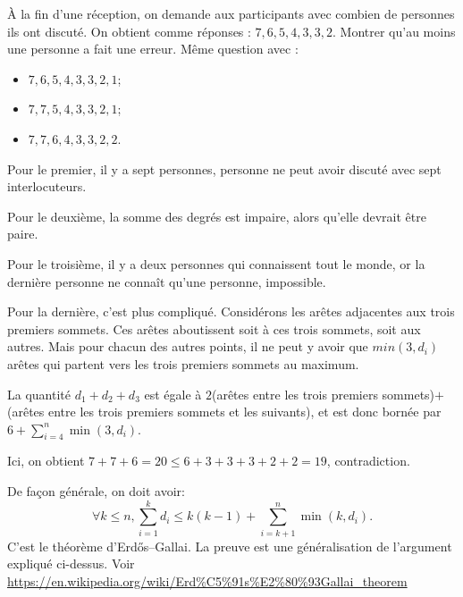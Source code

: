 \begin{exo}
À la fin d'une réception, on demande aux participants avec combien de personnes ils ont discuté. On obtient comme réponses : $7, 6, 5, 4, 3, 3, 2$. Montrer qu'au moins une personne a fait une erreur.
Même question avec :
\begin{itemize}
\item $7,6,5,4,3,3,2,1$; %
\item $7,7,5,4,3,3,2,1$;%
\item $7,7,6,4,3,3,2,2$. %
\end{itemize}
\begin{sol}
Pour le premier, il y a sept personnes, personne ne peut avoir discuté avec sept interlocuteurs.

Pour le deuxième, la somme des degrés est impaire, alors qu'elle devrait être paire.

Pour le troisième, il y a deux personnes qui connaissent tout le monde, or la dernière personne ne connaît qu'une personne, impossible.

Pour la dernière, c'est plus compliqué. Considérons les arêtes adjacentes aux trois premiers sommets. Ces arêtes aboutissent soit à ces trois sommets, soit aux autres. Mais pour chacun des autres points, il ne peut y avoir que $min(3,d_i)$ arêtes qui partent vers les trois premiers sommets au maximum.

La quantité $d_1+d_2+d_3$ est égale à $2$(arêtes entre les trois premiers sommets)$+$(arêtes entre les trois premiers sommets et les suivants), et est donc bornée par $6+\sum_{i=4}^n \min(3,d_i)$.

Ici, on obtient $7+7+6=20 \leq 6 + 3+3+3+2+2=19$, contradiction.

De façon générale, on doit avoir:
\[ \forall k\leq n, \sum_{i=1}^k d_i \leq k(k-1) + \sum_{i=k+1}^n \min(k,d_i).\] 
C'est le théorème d'Erdős–Gallai. La preuve est une généralisation de l'argument expliqué ci-dessus. Voir \url{https://en.wikipedia.org/wiki/Erd%C5%91s%E2%80%93Gallai_theorem}
\end{sol}
\end{exo}



